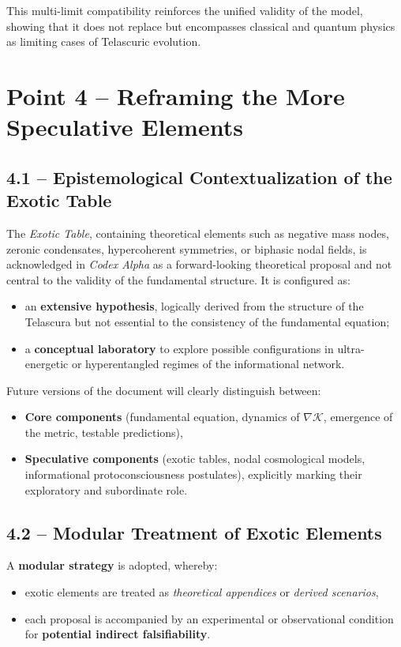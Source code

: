\documentclass[12pt]{article}
\begin{document}
This multi-limit compatibility reinforces the unified validity of the model, showing that it does not replace but encompasses classical and quantum physics as limiting cases of Telascuric evolution.

\section*{Point 4 – Reframing the More Speculative Elements}

\subsection*{4.1 – Epistemological Contextualization of the Exotic Table}

The \textit{Exotic Table}, containing theoretical elements such as negative mass nodes, zeronic condensates, hypercoherent symmetries, or biphasic nodal fields, is acknowledged in \textit{Codex Alpha} as a forward-looking theoretical proposal and not central to the validity of the fundamental structure. It is configured as:
\begin{itemize}
  \item an \textbf{extensive hypothesis}, logically derived from the structure of the Telascura but not essential to the consistency of the fundamental equation;
  \item a \textbf{conceptual laboratory} to explore possible configurations in ultra-energetic or hyperentangled regimes of the informational network.
\end{itemize}

Future versions of the document will clearly distinguish between:
\begin{itemize}
  \item \textbf{Core components} (fundamental equation, dynamics of $\nabla \mathcal{K}$, emergence of the metric, testable predictions),
  \item \textbf{Speculative components} (exotic tables, nodal cosmological models, informational protoconsciousness postulates), explicitly marking their exploratory and subordinate role.
\end{itemize}

\subsection*{4.2 – Modular Treatment of Exotic Elements}

A \textbf{modular strategy} is adopted, whereby:
\begin{itemize}
  \item exotic elements are treated as \textit{theoretical appendices} or \textit{derived scenarios},
  \item each proposal is accompanied by an experimental or observational condition for \textbf{potential indirect falsifiability}.
\end{itemize}
\end{document}

